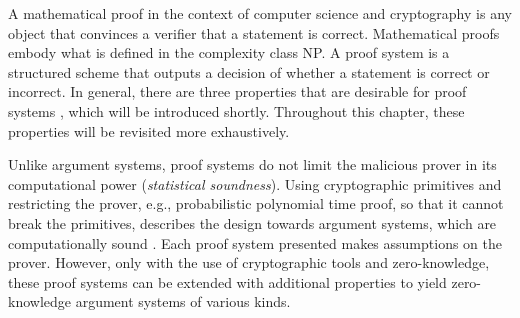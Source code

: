 A mathematical proof in the context of computer science and cryptography is any object that convinces a verifier that a statement is correct. Mathematical proofs embody what is defined in the complexity class NP. A proof system is a structured scheme that outputs a decision of whether a statement is correct or incorrect. In general, there are three properties that are desirable for proof systems \citep{GoldwasserIPs}, which will be introduced shortly. Throughout this chapter, these properties will be revisited more exhaustively.
\begin{itemize}
\end{itemize}
Unlike argument systems, proof systems do not limit the malicious prover in its computational power (\textit{statistical soundness}). Using cryptographic primitives and restricting the prover, e.g., probabilistic polynomial time proof, so that it cannot break the primitives, describes the design towards argument systems, which are computationally sound \citep{ArgSystems, MicaliArgSys}. Each proof system presented makes assumptions on the prover. However, only with the use of cryptographic tools and zero-knowledge, these proof systems can be extended with additional properties to yield zero-knowledge argument systems of various kinds.

